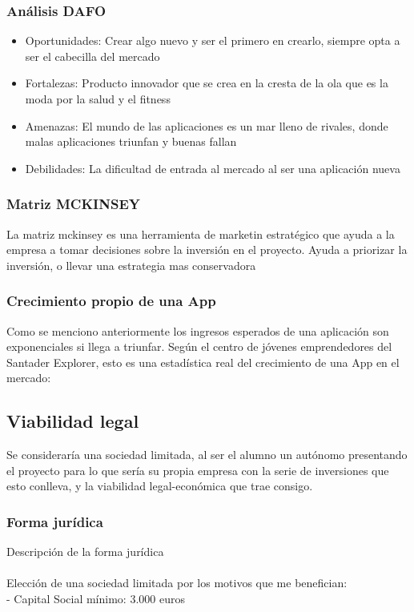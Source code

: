 \subsubsection{Análisis DAFO}
\begin{itemize}
\item Oportunidades: Crear algo nuevo y ser el primero en crearlo, siempre opta a ser el cabecilla del mercado
\item Fortalezas: Producto innovador que se crea en la cresta de la ola que es la moda por la salud y el fitness
\item Amenazas: El mundo de las aplicaciones es un mar lleno de rivales, donde malas aplicaciones triunfan y buenas fallan
\item Debilidades: La dificultad de entrada al mercado al ser una aplicación nueva	
\end{itemize}
\subsubsection{Matriz MCKINSEY}
La matriz mckinsey es una herramienta de marketin estratégico que ayuda a la empresa a tomar decisiones sobre la inversión en el proyecto. Ayuda a priorizar la inversión, o llevar una estrategia mas conservadora
\subsubsection{Crecimiento propio de una App}
Como se menciono anteriormente los ingresos esperados de una aplicación son exponenciales si llega a triunfar. Según el centro de jóvenes emprendedores del Santader Explorer, esto es una estadística real del crecimiento de una App en el mercado:
\subsection{Viabilidad legal}
Se consideraría una sociedad limitada, al ser el alumno un autónomo presentando el proyecto para lo que sería su propia empresa con la serie de inversiones que esto conlleva, y la viabilidad legal-económica que trae consigo.
\subsubsection{Forma jurídica}
Descripción de la forma jurídica\\
\\
Elección de una sociedad limitada por los motivos que me benefician:\\
- Capital Social mínimo: 3.000 euros  \\

